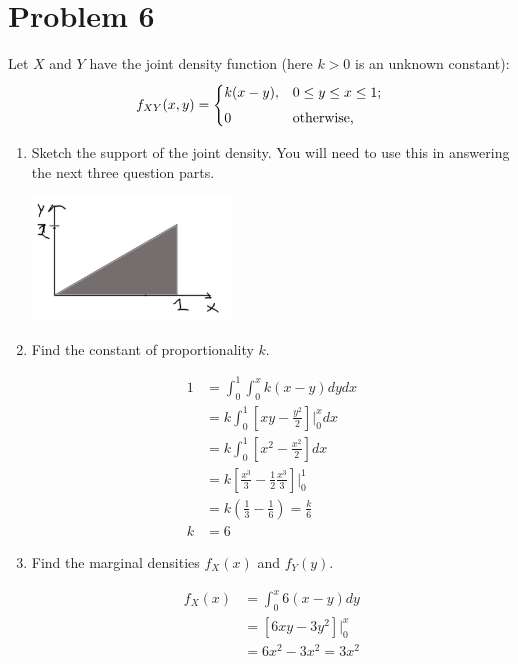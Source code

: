 \documentclass{article}
\newcommand{\1}{\mathbf{1}}
\begin{document}
\newpage
\section*{Problem 6}  Let $X$ and $Y$ have the joint density function (here $k>0$ is an unknown constant):
$$ f_{XY}(x,y) = \begin{cases}
    k(x-y), & 0\leq y\leq x \leq 1;\\[4pt]
    0 & \hbox{otherwise,}
\end{cases}$$

\begin{enumerate}
    \item Sketch the support of the joint density. You will need to use this in answering the next three question parts.
    
    \begin{center}
    \includegraphics[width=200px]{STATS509/HW4/HW4Figures/picasso4.png}
    \end{center}

    \item Find the constant of proportionality $k$.
    
    \begin{align*}
    1 &= \int_0^1\int_0^x k(x-y)dydx\\
      &= k \int_0^1 \left[xy - \frac{y^2}{2}\right]\bigg |_0^x dx \\
      &= k \int_0^1 \left[x^2 - \frac{x^2}{2}\right] dx \\
      &= k \left[ \frac{x^3}{3} - \frac{1}{2}\frac{x^3}{3} \right] \bigg |_0^1 \\
      &= k \left( \frac{1}{3} - \frac{1}{6}\right) = \frac{k}{6}\\
    k &= 6
    \end{align*}

    \item Find the marginal densities $f_X(x)$ and $f_Y(y)$.
    
    \begin{align*}
    f_X(x) &= \int_0^x 6(x-y) dy \\
    &= \left[6xy - 3y^2\right]\bigg|_0^x \\
    &= 6x^2-3x^2 = 3x^2
    \end{align*}
    

\end{enumerate}
\end{document}
